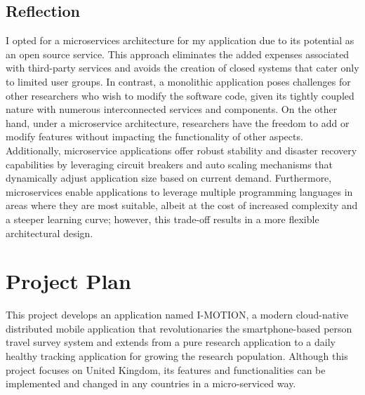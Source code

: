 \documentclass[12pt,two side]{report}
\begin{document}
\section{Reflection}
I opted for a microservices architecture for my application due to its potential as an open source service. This approach eliminates the added expenses associated with third-party services and avoids the creation of closed systems that cater only to limited user groups. In contrast, a monolithic application poses challenges for other researchers who wish to modify the software code, given its tightly coupled nature with numerous interconnected services and components. On the other hand, under a microservice architecture, researchers have the freedom to add or modify features without impacting the functionality of other aspects. Additionally, microservice applications offer robust stability and disaster recovery capabilities by leveraging circuit breakers and auto scaling mechanisms that dynamically adjust application size based on current demand. Furthermore, microservices enable applications to leverage multiple programming languages in areas where they are most suitable, albeit at the cost of increased complexity and a steeper learning curve; however, this trade-off results in a more flexible architectural design.

\chapter{Project Plan}
This project develops an application named I-MOTION, a modern cloud-native distributed mobile application that revolutionaries the smartphone-based person travel survey system and extends from a pure research application to a daily healthy tracking application for growing the research population. Although this project focuses on United Kingdom, its features and functionalities can be implemented and changed in any countries in a micro-serviced way.\newline
\end{document}
